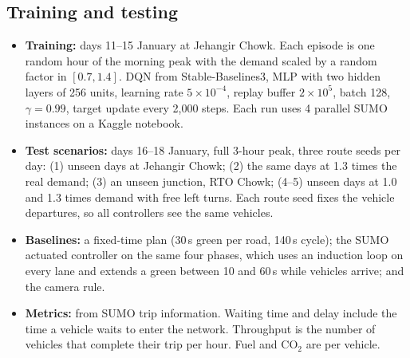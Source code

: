 \subsection{Training and testing}
\begin{itemize}
  \item \textbf{Training:} days 11--15 January at Jehangir Chowk. Each episode is one random hour
        of the morning peak with the demand scaled by a random factor in $[0.7,1.4]$.
        DQN from Stable-Baselines3, MLP with two hidden layers of 256 units,
        learning rate $5\times10^{-4}$, replay buffer $2\times10^5$, batch 128, $\gamma=0.99$,
        target update every 2{,}000 steps. Each run uses 4 parallel SUMO instances on a Kaggle
        notebook.
  \item \textbf{Test scenarios:} days 16--18 January, full 3-hour peak, three route seeds per day:
        (1) unseen days at Jehangir Chowk; (2) the same days at 1.3 times the real demand;
        (3) an unseen junction, RTO Chowk; (4--5) unseen days at 1.0 and 1.3 times demand with
        free left turns. Each route seed fixes the vehicle departures, so all controllers see the
        same vehicles.
  \item \textbf{Baselines:} a fixed-time plan (30\,s green per road, 140\,s cycle); the SUMO
        actuated controller on the same four phases, which uses an induction loop on every lane
        and extends a green between 10 and 60\,s while vehicles arrive; and the camera rule.
  \item \textbf{Metrics:} from SUMO trip information. Waiting time and delay include the time a
        vehicle waits to enter the network. Throughput is the number of vehicles that complete
        their trip per hour. Fuel and CO$_2$ are per vehicle.
\end{itemize}

